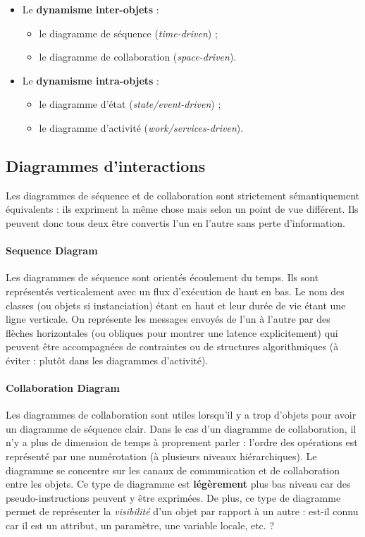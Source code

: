 \documentclass{article}
\begin{document}
	\begin{itemize}
		\item Le \textbf{dynamisme inter-objets} :
			\begin{itemize}
				\item le diagramme de séquence (\textit{time-driven}) ;
				\item le diagramme de collaboration (\textit{space-driven}).
			\end{itemize}
		\item Le \textbf{dynamisme intra-objets} :
			\begin{itemize}
				\item le diagramme d'état (\textit{state/event-driven}) ;
				\item le diagramme d'activité (\textit{work/services-driven}).
			\end{itemize}
	\end{itemize}

	\subsection{Diagrammes d'interactions}
		Les diagrammes de séquence et de collaboration sont strictement sémantiquement équivalents : ils expriment la même chose mais selon un point de vue différent. Ils peuvent donc
		tous deux être convertis l'un en l'autre sans perte d'information.

		\paragraph{Sequence Diagram} Les diagrammes de séquence sont orientés écoulement du temps. Ils sont représentés verticalement avec un flux d'exécution de haut en bas. Le nom
		des classes (ou objets si instanciation) étant en haut et leur durée de vie étant une ligne verticale. On représente les messages envoyés de l'un à l'autre par des flèches horizontales
		(ou obliques pour montrer une latence explicitement) qui peuvent être accompagnées de contraintes ou de structures algorithmiques (à éviter : plutôt dans les diagrammes d'activité).

		\paragraph{Collaboration Diagram} Les diagrammes de collaboration sont utiles lorsqu'il y a trop d'objets pour avoir un diagramme de séquence clair. Dans le cas d'un diagramme de
		collaboration, il n'y a plus de dimension de temps à proprement parler : l'ordre des opérations est représenté par une numérotation (à plusieurs niveaux hiérarchiques). Le diagramme se
		concentre sur les canaux de communication et de collaboration entre les objets. Ce type de diagramme est \textbf{légèrement} plus bas niveau car des pseudo-instructions peuvent y être
		exprimées. De plus, ce type de diagramme permet de représenter la \textit{visibilité} d'un objet par rapport à un autre : est-il connu car il est un attribut, un paramètre, une variable
		locale, etc. ?
	
\end{document}
